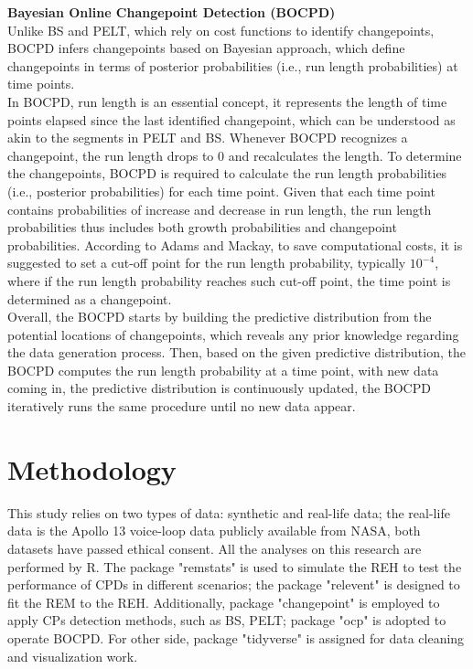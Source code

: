 \documentclass[]{interact}
\theoremstyle{plain}%
\theoremstyle{definition}
\theoremstyle{remark}
\begin{document}
\hspace{-0.55cm} \textbf{Bayesian Online Changepoint Detection (BOCPD)}\\

Unlike BS and PELT, which rely on cost functions to identify changepoints, BOCPD infers changepoints based on Bayesian approach, which define changepoints in terms of posterior probabilities (i.e., run length probabilities) at time points. \\

In BOCPD, run length is an essential concept, it represents the length of time points elapsed since the last identified changepoint, which can be understood as akin to the segments in PELT and BS. Whenever BOCPD recognizes a changepoint, the run length drops to 0 and recalculates the length. To determine the changepoints, BOCPD is required to calculate the run length probabilities (i.e., posterior probabilities) for each time point. Given that each time point contains probabilities of increase and decrease in run length, the run length probabilities thus includes both growth probabilities and changepoint probabilities. According to Adams and Mackay\cite{adamsBayesianOnlineChangepoint2007}, to save computational costs, it is suggested to set a cut-off point for the run length probability, typically $10^{-4}$, where if the run length probability reaches such cut-off point, the time point is determined as a changepoint. \\

Overall, the BOCPD starts by building the predictive distribution from the potential locations of changepoints, which reveals any prior knowledge regarding the data generation process. Then, based on the given predictive distribution, the BOCPD computes the run length probability at a time point, with new data coming in, the predictive distribution is continuously updated, the BOCPD iteratively runs the same procedure until no new data appear. \\

\section{\fontsize{14}{15}\selectfont Methodology}

\hspace{0.2cm} This study relies on two types of data: synthetic and real-life data; the real-life data is the Apollo 13 voice-loop data publicly available from NASA, both datasets have passed ethical consent. All the analyses on this research are performed by R. The package "remstats" is used to simulate the REH to test the performance of CPDs in different scenarios; the package "relevent" is designed to fit the REM to the REH. Additionally, package "changepoint" is employed to apply CPs detection methods, such as BS, PELT; package "ocp" is adopted to operate BOCPD. For other side, package "tidyverse" is assigned for data cleaning and visualization work.\\
\end{document}
